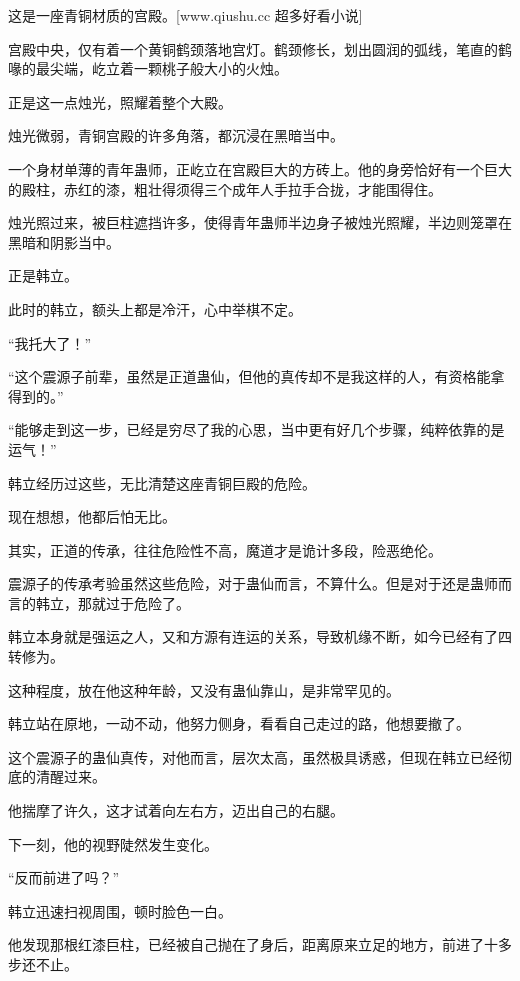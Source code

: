 
\begin{this_body}

这是一座青铜材质的宫殿。[www.qiushu.cc 超多好看小说]

宫殿中央，仅有着一个黄铜鹤颈落地宫灯。鹤颈修长，划出圆润的弧线，笔直的鹤喙的最尖端，屹立着一颗桃子般大小的火烛。

正是这一点烛光，照耀着整个大殿。

烛光微弱，青铜宫殿的许多角落，都沉浸在黑暗当中。

一个身材单薄的青年蛊师，正屹立在宫殿巨大的方砖上。他的身旁恰好有一个巨大的殿柱，赤红的漆，粗壮得须得三个成年人手拉手合拢，才能围得住。

烛光照过来，被巨柱遮挡许多，使得青年蛊师半边身子被烛光照耀，半边则笼罩在黑暗和阴影当中。

正是韩立。

此时的韩立，额头上都是冷汗，心中举棋不定。

“我托大了！”

“这个震源子前辈，虽然是正道蛊仙，但他的真传却不是我这样的人，有资格能拿得到的。”

“能够走到这一步，已经是穷尽了我的心思，当中更有好几个步骤，纯粹依靠的是运气！”

韩立经历过这些，无比清楚这座青铜巨殿的危险。

现在想想，他都后怕无比。

其实，正道的传承，往往危险性不高，魔道才是诡计多段，险恶绝伦。

震源子的传承考验虽然这些危险，对于蛊仙而言，不算什么。但是对于还是蛊师而言的韩立，那就过于危险了。

韩立本身就是强运之人，又和方源有连运的关系，导致机缘不断，如今已经有了四转修为。

这种程度，放在他这种年龄，又没有蛊仙靠山，是非常罕见的。

韩立站在原地，一动不动，他努力侧身，看看自己走过的路，他想要撤了。

这个震源子的蛊仙真传，对他而言，层次太高，虽然极具诱惑，但现在韩立已经彻底的清醒过来。

他揣摩了许久，这才试着向左右方，迈出自己的右腿。

下一刻，他的视野陡然发生变化。

“反而前进了吗？”

韩立迅速扫视周围，顿时脸色一白。

他发现那根红漆巨柱，已经被自己抛在了身后，距离原来立足的地方，前进了十多步还不止。


\end{this_body}
